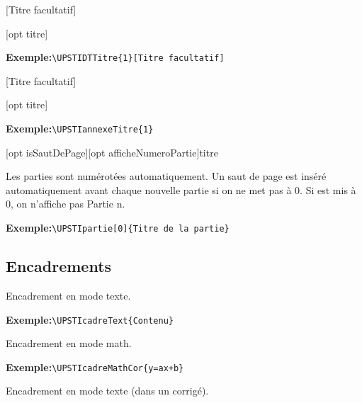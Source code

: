 \documentclass[11pt]{ltxdockit}[2010/09/26]
\newcommand{\ex}{\noindent \textbf{Exemple:}\quad}
\begin{document}
[Titre facultatif]

\vspace{1em}
\begin{ltxsyntax}
[opt titre]
\end{ltxsyntax}
\ex\verb!\UPSTIDTTitre{1}[Titre facultatif]!

[Titre facultatif]

\vspace{1em}
\begin{ltxsyntax}
[opt titre]
\end{ltxsyntax}
\ex\verb!\UPSTIannexeTitre{1}!


\vspace{1em}
\begin{ltxsyntax}
[opt isSautDePage][opt afficheNumeroPartie]{titre}
\end{ltxsyntax}
Les parties sont numérotées automatiquement. Un saut de page est inséré automatiquement avant chaque nouvelle partie si on ne met pas  à 0. Si  est mis à 0, on n'affiche pas \og Partie n\fg{}.

\ex\verb!\UPSTIpartie[0]{Titre de la partie}!



\subsection{Encadrements}
\begin{ltxsyntax}
\end{ltxsyntax}
Encadrement en mode texte.

\ex\verb!\UPSTIcadreText{Contenu}!

\vspace{1em}

\vspace{1em}
\begin{ltxsyntax}
\end{ltxsyntax}
Encadrement en mode math.

\ex\verb!\UPSTIcadreMathCor{y=ax+b}!

\vspace{1em}

\vspace{1em}
\begin{ltxsyntax}
\end{ltxsyntax}
Encadrement en mode texte (dans un corrigé).
\end{document}
